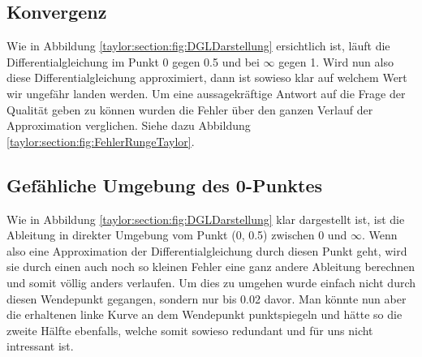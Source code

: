 \subsection{Konvergenz}
\label{taylor:subsection:Konvergenz}
Wie in Abbildung 
\ref{taylor:section:fig:DGLDarstellung}
ersichtlich ist, läuft die Differentialgleichung im Punkt 0 gegen 0.5 und bei $\infty$ gegen 1.
Wird nun also diese Differentialgleichung approximiert, dann ist sowieso klar auf welchem Wert wir ungefähr landen werden.
Um eine aussagekräftige Antwort auf die Frage der Qualität geben zu können wurden die Fehler über den ganzen Verlauf der Approximation verglichen. Siehe dazu Abbildung \ref{taylor:section:fig:FehlerRungeTaylor}.

\subsection{Gefähliche Umgebung des 0-Punktes}
\label{taylor:subsection:0Punkt}
Wie in Abbildung 
\ref{taylor:section:fig:DGLDarstellung}
klar dargestellt ist, ist die Ableitung in direkter Umgebung vom Punkt (0, 0.5) zwischen 0 und $\infty$.
Wenn also eine Approximation der Differentialgleichung durch diesen Punkt geht, wird sie durch einen auch noch so kleinen Fehler eine ganz andere Ableitung berechnen und somit völlig anders verlaufen.
Um dies zu umgehen wurde einfach nicht durch diesen Wendepunkt gegangen, sondern nur bis 0.02 davor.
Man könnte nun aber die erhaltenen linke Kurve an dem Wendepunkt punktspiegeln und hätte so die zweite Hälfte ebenfalls, welche somit sowieso redundant und für uns nicht intressant ist.



